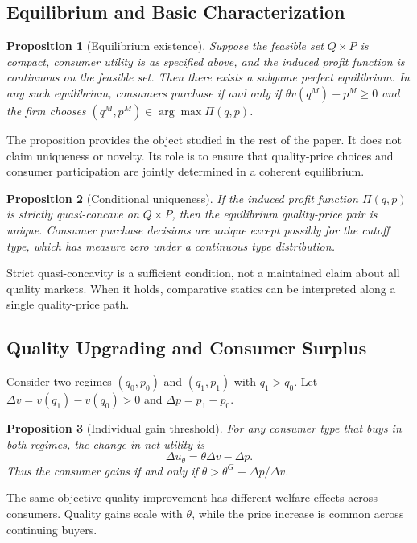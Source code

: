 \documentclass[12pt]{article}
\theoremstyle{plain}
\newtheorem{proposition}{Proposition}
\theoremstyle{definition}
\theoremstyle{remark}
\begin{document}
\subsection{Equilibrium and Basic Characterization}

\begin{proposition}[Equilibrium existence]
Suppose the feasible set $Q\times P$ is compact, consumer utility is as specified above, and the induced profit function is continuous on the feasible set. Then there exists a subgame perfect equilibrium. In any such equilibrium, consumers purchase if and only if $\theta v(q^M)-p^M\geq 0$ and the firm chooses $(q^M,p^M)\in\arg\max\Pi(q,p)$.
\end{proposition}

The proposition provides the object studied in the rest of the paper. It does not claim uniqueness or novelty. Its role is to ensure that quality-price choices and consumer participation are jointly determined in a coherent equilibrium.

\begin{proposition}[Conditional uniqueness]
If the induced profit function $\Pi(q,p)$ is strictly quasi-concave on $Q\times P$, then the equilibrium quality-price pair is unique. Consumer purchase decisions are unique except possibly for the cutoff type, which has measure zero under a continuous type distribution.
\end{proposition}

Strict quasi-concavity is a sufficient condition, not a maintained claim about all quality markets. When it holds, comparative statics can be interpreted along a single quality-price path.

\subsection{Quality Upgrading and Consumer Surplus}

Consider two regimes $(q_0,p_0)$ and $(q_1,p_1)$ with $q_1>q_0$. Let $\Delta v=v(q_1)-v(q_0)>0$ and $\Delta p=p_1-p_0$.

\begin{proposition}[Individual gain threshold]
For any consumer type that buys in both regimes, the change in net utility is
\[
 \Delta u_\theta=\theta\Delta v-\Delta p.
\]
Thus the consumer gains if and only if $\theta>\theta^G\equiv\Delta p/\Delta v$.
\end{proposition}

The same objective quality improvement has different welfare effects across consumers. Quality gains scale with $\theta$, while the price increase is common across continuing buyers.
\end{document}
